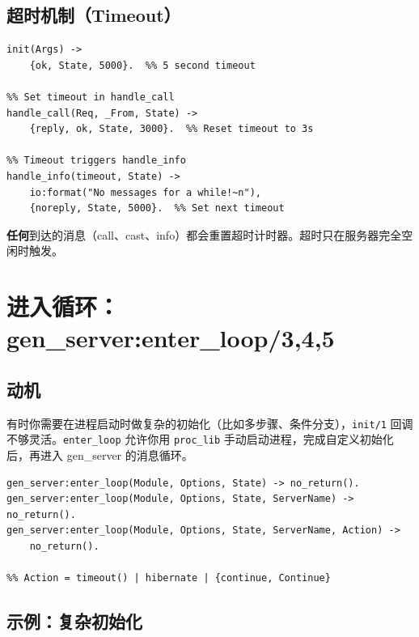 \documentclass[a4paper,11pt]{article}
\begin{document}
\subsection{超时机制（Timeout）}

\begin{lstlisting}[style=erlangstyle, caption={超时机制}]
%% Set timeout in init
init(Args) ->
    {ok, State, 5000}.  %% 5 second timeout

%% Set timeout in handle_call
handle_call(Req, _From, State) ->
    {reply, ok, State, 3000}.  %% Reset timeout to 3s

%% Timeout triggers handle_info
handle_info(timeout, State) ->
    io:format("No messages for a while!~n"),
    {noreply, State, 5000}.  %% Set next timeout
\end{lstlisting}

\begin{warnbox}[超时重置规则]
\textbf{任何}到达的消息（call、cast、info）都会重置超时计时器。超时只在服务器完全空闲时触发。
\end{warnbox}


\section{进入循环：gen\_server:enter\_loop/3,4,5}

\subsection{动机}

有时你需要在进程启动时做复杂的初始化（比如多步骤、条件分支），\texttt{init/1} 回调不够灵活。\texttt{enter\_loop} 允许你用 \texttt{proc\_lib} 手动启动进程，完成自定义初始化后，再进入 gen\_server 的消息循环。

\begin{lstlisting}[style=erlangstyle, caption={enter\_loop 函数签名}]
gen_server:enter_loop(Module, Options, State) -> no_return().
gen_server:enter_loop(Module, Options, State, ServerName) -> no_return().
gen_server:enter_loop(Module, Options, State, ServerName, Action) ->
    no_return().

%% Action = timeout() | hibernate | {continue, Continue}
\end{lstlisting}

\subsection{示例：复杂初始化}
\end{document}
